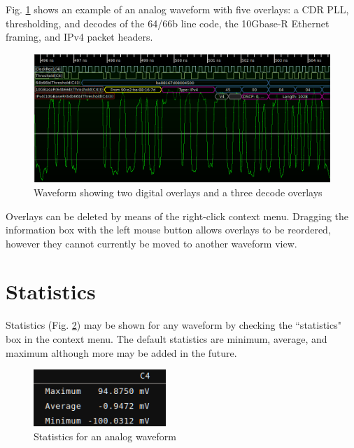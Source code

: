 Fig. \ref{overlays} shows an example of an analog waveform with five overlays: a CDR PLL, thresholding, and decodes of
the 64/66b line code, the 10Gbase-R Ethernet framing, and IPv4 packet headers.

\begin{figure}[H]
\centering
\includegraphics[width=14cm]{images/overlays.png}
\caption{Waveform showing two digital overlays and a three decode overlays}
\label{overlays}
\end{figure}

Overlays can be deleted by means of the right-click context menu. Dragging the information box with the left mouse
button allows overlays to be reordered, however they cannot currently be moved to another waveform view.

\section{Statistics}

Statistics (Fig. \ref{stats}) may be shown for any waveform by checking the ``statistics" box in the context menu. The
default statistics are minimum, average, and maximum although more may be added in the future.


\begin{figure}[H]
\centering
\includegraphics[width=5cm]{images/stats.png}
\caption{Statistics for an analog waveform}
\label{stats}
\end{figure}
